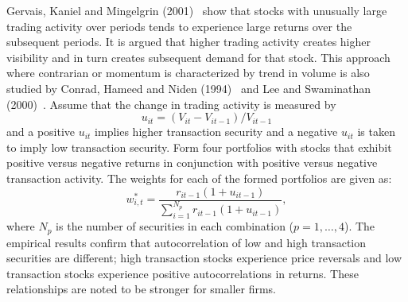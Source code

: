Gervais, Kaniel and Mingelgrin (2001)~\cite{germing} show that stocks with unusually large trading activity over periods tends to experience large returns over the subsequent periods. It is argued that higher trading activity creates higher visibility and in turn creates subsequent demand for that stock. This approach where contrarian or momentum is characterized by trend in volume is also studied by Conrad, Hameed and Niden (1994)~\cite{conniden} and Lee and Swaminathan (2000)~\cite{lee2000}. Assume that the change in trading activity is measured by
	\begin{equation} \label{eqn:uit3}
	u_{it}= (V_{it} - V_{it-1}) / V_{it-1}
	\end{equation}   
and a positive $u_{it}$ implies higher transaction security and a negative $u_{it}$ is taken to imply low transaction security. Form four portfolios with stocks that exhibit positive versus negative returns in conjunction with positive versus negative transaction activity. The weights for each of the formed portfolios are given as:
	\begin{equation} \label{eqn:wip3}
	w^*_{i,t} = \dfrac{r_{it-1}(1+u_{it-1})}{\sum_{i=1}^{N_p} r_{it-1}(1+u_{it-1})},
	\end{equation}
where $N_p$ is the number of securities in each combination ($p=1, \ldots, 4$). The empirical results confirm that autocorrelation of low and high transaction securities are different; high transaction stocks experience price reversals and low transaction stocks experience positive autocorrelations in returns. These relationships are noted to be stronger for smaller firms. 


